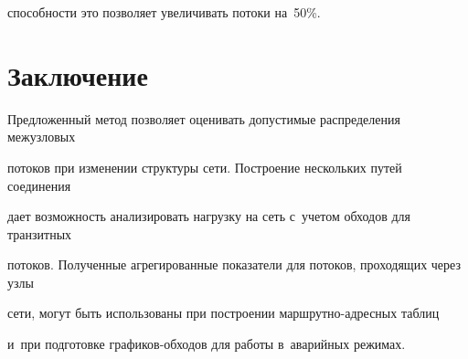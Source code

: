 спо\-соб\-ности это позволяет увеличивать потоки на~50\%. 





\vspace*{-4pt}





\section{Заключение}





\vspace*{-2pt}





Предложенный метод позволяет оценивать допустимые распределения межузловых 


потоков при изменении структуры сети. Построение нескольких путей соединения 


дает возможность анализировать нагрузку на сеть с~учетом обходов для транзитных 


потоков. Полученные агрегированные показатели для потоков, проходящих через узлы 


сети, могут быть использованы при построении марш\-рут\-но-ад\-рес\-ных таб\-лиц 


и~при подготовке гра\-фи\-ков-об\-хо\-дов для работы в~аварийных режимах. 





\vspace*{-4pt}








